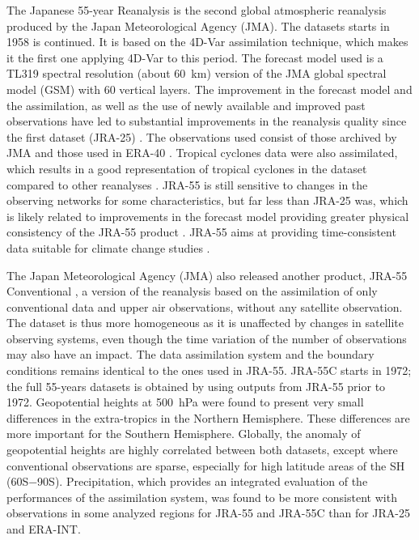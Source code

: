 \documentclass{ametsoc}
\begin{document}
The Japanese 55-year Reanalysis \citep[JRA-55, ][]{Kobayashi2015, Harada2016} is the second global atmospheric reanalysis produced by the Japan Meteorological Agency (JMA). The datasets starts in 1958 is continued. It is based on the 4D-Var assimilation technique, which makes it the first one applying 4D-Var to this period. The forecast model used is a TL319 spectral resolution (about 60~km) version of the JMA global spectral model (GSM) with 60 vertical layers. The improvement in the forecast model and the assimilation, as well as the use of newly available and improved past observations have led to substantial improvements in the reanalysis quality since the first dataset (JRA-25) \citep{Kobayashi2015, Harada2016}. The observations used consist of those archived by JMA and those used in ERA-40 \citep{Uppala2005}. Tropical cyclones data were also assimilated, which results in a good representation of tropical cyclones in the dataset compared to other reanalyses \citep{Harada2016}. JRA-55 is still sensitive to changes in the observing networks for some characteristics, but far less than JRA-25 was, which is likely related to improvements in the forecast model providing greater physical consistency of the JRA-55 product \citep{Kobayashi2015}. JRA-55 aims at providing time-consistent data suitable for climate change studies \citep{Ebita2011}.

The Japan Meteorological Agency (JMA) also released another product, JRA-55 Conventional \citep[JRA-55C,][]{Kobayashi2014}, a version of the reanalysis based on the assimilation of only conventional data and upper air observations, without any satellite observation. The dataset is thus more homogeneous as it is unaffected by changes in satellite observing systems, even though the time variation of the number of observations may also have an impact. The data assimilation system and the boundary conditions remains identical to the ones used in JRA-55. JRA-55C starts in 1972; the full 55-years datasets is obtained by using outputs from JRA-55 prior to 1972. Geopotential heights at 500~hPa were found to present very small differences in the extra-tropics in the Northern Hemisphere. These differences are more important for the Southern Hemisphere. Globally, the anomaly  of geopotential heights are highly correlated between both datasets, except where conventional observations are sparse, especially for high latitude areas of the SH (60\degree S−90\degree S). Precipitation, which provides an integrated evaluation of the performances of the assimilation system, was found to be more consistent with observations in some analyzed regions for JRA-55 and JRA-55C than for JRA-25 and ERA-INT.
\end{document}
